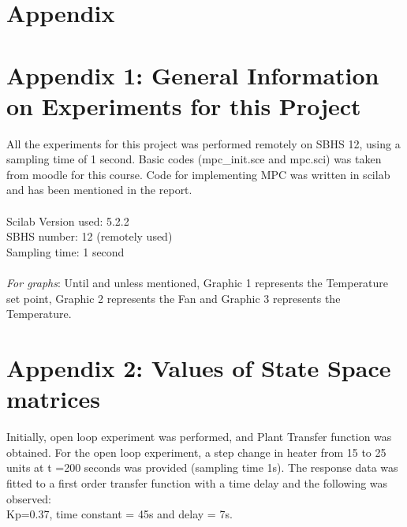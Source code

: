 \section{Appendix}
\section{Appendix 1: General Information on Experiments for this Project}
All the experiments for this project was performed remotely on SBHS 12, using a sampling time of 1 second. Basic codes (mpc\_init.sce and mpc.sci) was taken from moodle for this course. Code for implementing MPC was written in scilab and has been mentioned in the report. \\ \\
Scilab Version used: 5.2.2 \\
SBHS number: 12 (remotely used) \\
Sampling time: 1 second \\ \\
\emph{For graphs}: Until and unless mentioned, Graphic 1 represents the Temperature set point, Graphic 2 represents the Fan and Graphic 3 represents the Temperature.

\section{Appendix 2: Values of State Space matrices}
Initially, open loop experiment was performed, and Plant Transfer function was obtained. For the open loop experiment, a step change in heater from 15 to 25 units at t =200 seconds was provided (sampling time 1s). The response data was fitted to a first order transfer function with a time delay and the following was observed: \\
Kp=0.37, time constant = 45s and delay = 7s. \\ \\

